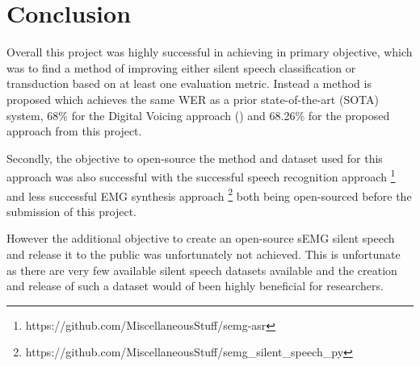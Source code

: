 \chapter{Conclusion} \label{chap:conclusion}

Overall this project was highly successful in achieving in primary objective,
which was to find a method of improving either silent speech classification
or transduction based on at least one evaluation metric. Instead a method is
proposed which achieves the same WER as a prior state-of-the-art (SOTA)
system, 68\% for the Digital Voicing approach (\cite{gaddy2020digital})
and 68.26\% for the proposed approach from this project.

Secondly, the objective to open-source the method and dataset used for
this approach was also successful with the successful
speech recognition approach
\footnote{https://github.com/MiscellaneousStuff/semg-asr}
and less successful EMG synthesis approach
\footnote{https://github.com/MiscellaneousStuff/semg\_silent\_speech\_py}
both being open-sourced before the submission of this project.

However the additional objective to create an open-source sEMG silent
speech and release it to the public was unfortunately not achieved.
This is unfortunate as there are very few available silent speech datasets
available and the creation and release of such a dataset would of been
highly beneficial for researchers.